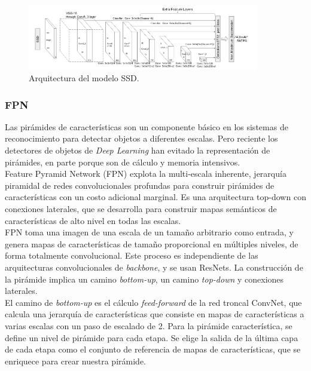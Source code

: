 \documentclass{bmvc2k}
\begin{document}
\begin{figure}
\begin{center}
	\includegraphics[width=0.9\textwidth]{images/ssd.png}
   \caption{Arquitectura del modelo SSD.}
	\label{fig.ssd}
\end{center}
\end{figure}

\subsubsection{FPN}

Las pirámides de características son un componente básico en los sistemas de reconocimiento para detectar objetos a diferentes escalas. Pero reciente los detectores de objetos de \textit{Deep Learning} han evitado la representación de pirámides, en parte porque son de cálculo y memoria intensivos. \\

Feature Pyramid Network (FPN) explota la multi-escala inherente, jerarquía piramidal de redes convolucionales profundas para construir pirámides de características con un costo adicional marginal. Es una arquitectura top-down con conexiones laterales, que se desarrolla para construir mapas semánticos de características de alto nivel en todas las escalas.\\

FPN toma una imagen de una escala de un tamaño arbitrario como entrada, y genera mapas de características de tamaño proporcional en múltiples niveles, de forma totalmente convolucional. Este proceso es independiente de las arquitecturas convolucionales de \textit{backbone}, y se usan ResNets. La construcción de la pirámide implica un camino \textit{bottom-up}, un camino \textit{top-down} y conexiones laterales.\\

El camino de \textit{bottom-up} es el cálculo \textit{feed-forward} de la red troncal ConvNet, que calcula una jerarquía de características que consiste en mapas de características a varias escalas con un paso de escalado de 2. Para la pirámide característica, se define un nivel de pirámide para cada etapa. Se elige la salida de la última capa de cada etapa como el conjunto de referencia de mapas de características, que se enriquece para crear nuestra pirámide.\\
\end{document}
